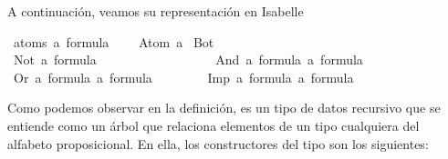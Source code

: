 \begin{isabellebody}
\begin{isamarkuptext}
  A continuación, veamos su representación en Isabelle%
\end{isamarkuptext}\isamarkuptrue%
\isamarkupfalse%
\ {\isacharparenleft}atoms{\isacharcolon}\ {\isacharprime}a{\isacharparenright}\ formula\ {\isacharequal}\ \isanewline
\ \ Atom\ {\isacharprime}a\isanewline
{\isacharbar}\ Bot\ \ \ \ \ \ \ \ \ \ \ \ \ \ \ \ \ \ \ \ \ \ \ \ \ \ \ \ \ \ {\isacharparenleft}{\isachardoublequoteopen}{\isasymbottom}{\isachardoublequoteclose}{\isacharparenright}\ \ \isanewline
{\isacharbar}\ Not\ {\isachardoublequoteopen}{\isacharprime}a\ formula{\isachardoublequoteclose}\ \ \ \ \ \ \ \ \ \ \ \ \ \ \ \ \ {\isacharparenleft}{\isachardoublequoteopen}\isactrlbold {\isasymnot}{\isachardoublequoteclose}{\isacharparenright}\isanewline
{\isacharbar}\ And\ {\isachardoublequoteopen}{\isacharprime}a\ formula{\isachardoublequoteclose}\ {\isachardoublequoteopen}{\isacharprime}a\ formula{\isachardoublequoteclose}\ \ \ \ {\isacharparenleft}\ {\isachardoublequoteopen}\isactrlbold {\isasymand}{\isachardoublequoteclose}\ {}{}{\isacharparenright}\isanewline
{\isacharbar}\ Or\ {\isachardoublequoteopen}{\isacharprime}a\ formula{\isachardoublequoteclose}\ {\isachardoublequoteopen}{\isacharprime}a\ formula{\isachardoublequoteclose}\ \ \ \ \ {\isacharparenleft}\ {\isachardoublequoteopen}\isactrlbold {\isasymor}{\isachardoublequoteclose}\ {}{}{\isacharparenright}\isanewline
{\isacharbar}\ Imp\ {\isachardoublequoteopen}{\isacharprime}a\ formula{\isachardoublequoteclose}\ {\isachardoublequoteopen}{\isacharprime}a\ formula{\isachardoublequoteclose}\ \ \ \ {\isacharparenleft}\ {\isachardoublequoteopen}\isactrlbold {\isasymrightarrow}{\isachardoublequoteclose}\ {}{}{\isacharparenright}%
\begin{isamarkuptext}%
Como podemos observar en la definición,  es un 
  tipo de datos recursivo que se entiende como un árbol que relaciona 
  elementos de un tipo  cualquiera del alfabeto proposicional. En 
  ella, los constructores del tipo son los siguientes:


\end{isamarkuptext}
\end{isabellebody}
